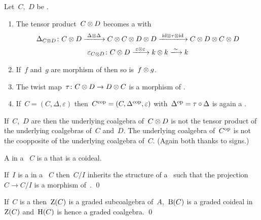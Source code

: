 \documentclass[a4paper,10pt,headings=standardclasses]{scrartcl}
\begin{document}
\begin{lemma}
  Let~$C$,~$D$ be {\dgcs}.
  \begin{enumerate}
    \item
      The tensor product~$C \otimes D$ becomes a {\dgc} with
      \begin{gather*}
        \Delta_{C \tensor D}
        \colon
        C \tensor D
        \xlongto{\Delta \tensor \Delta}
        C \tensor C \tensor D \tensor D
        \xlongto{{\id} \tensor \tau \tensor {\id}}
        C \tensor D \tensor C \tensor D
        \\
        \varepsilon_{C \tensor D}
        \colon
        C \tensor D
        \xlongto{\varepsilon \tensor \varepsilon}
        k \tensor k
        \xlongto{\sim}
        k
      \end{gather*}
    \item
      If~$f$ and~$g$ are morphism of {\dgcs} then so is~$f \otimes g$.
    \item
      The twist map~$\tau \colon C \otimes D \to D \otimes C$ is a morphism of {\dgcs}.
    \item
      If~$C = (C, \Delta, \varepsilon)$ then~$C^{\mathrm{cop}} = (C, \Delta^{\mathrm{cop}}, \varepsilon)$ with~$\Delta^{\mathrm{op}} = \tau \circ \Delta$ is again a {\dgc}.
  \end{enumerate}
\end{lemma}

\begin{warning}
  If~$C$,~$D$ are {\dgcs} then the underlying coalgebra of~$C \otimes D$ is not the tensor product of the underlying coalgebras of~$C$ and~$D$.
  The underlying coalgebra of~$C^{\mathrm{op}}$ is not the coopposite of the underlying coalgebra of~$C$.
  (Again both thanks to signs.)
\end{warning}

\begin{definition}
  A  in a {\dgc}~$C$ is a {\dgsub} that is a coideal.
\end{definition}

\begin{lemma}
  If~$I$ is a {\dgci} in a {\dgc}~$C$ then~$C/I$ inherits the structure of a~{\dgc} such that the projection~$C \to C/I$ is a morphism of~{\dgc}.
  \qed
\end{lemma}

\begin{proposition}
  If~$C$ is a {\dgc} then~$\operatorname{Z}(C)$ is a graded subcoalgebra of~$A$,~$\operatorname{B}(C)$ is a graded coideal in~$\operatorname{Z}(C)$ and~$\operatorname{H}(C)$ is hence a graded coalgebra.
  \qed
\end{proposition}
\end{document}
